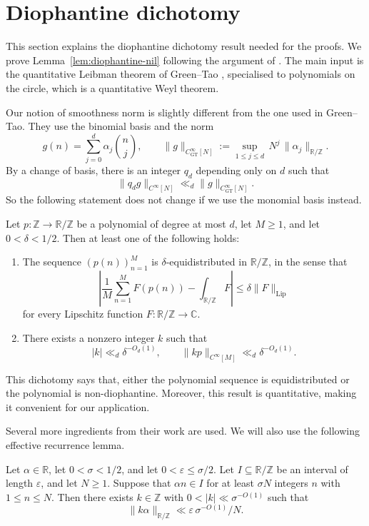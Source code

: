 \section{Diophantine dichotomy}
\label{sec:diophantine}
This section explains the diophantine dichotomy result needed for the proofs.
We
prove Lemma~\ref{lem:diophantine-nil}  following the
argument of \cite[\S3]{GTmob}. The main input is the quantitative Leibman theorem of Green--Tao \cite[Theorem~2.9, Proposition~4.3]{BT}, specialised to polynomials on the circle, which is a quantitative Weyl theorem.

Our notion of smoothness norm is slightly different from the one used in Green--Tao.
They \cite[Definition~2.7]{BT} use the binomial basis and the norm
\[
g(n)=\sum_{j=0}^d \alpha_j\binom{n}{j},
\qquad
\|g\|_{C_{\mathrm{GT}}^\infty[N]}
:=\sup_{1\leq j\leq d}\, N^j\,\|\alpha_j\|_{\mathbb{R}/\mathbb{Z}}.
\]
By a change of basis, there is an integer $q_d$ depending only on $d$ such that
\[
\|q_d g\|_{C^\infty[N]} \ll_d \|g\|_{C_{\mathrm{GT}}^\infty[N]}.
\]
So the following statement does not change if we use the monomial basis instead.

\begin{theorem}
\label{prop:quantitative-weyl-circle}
\label{prop:gt-weyl}
Let \(p\colon\mathbb Z\to\mathbb R/\mathbb Z\) be a polynomial of degree at
most \(d\), let \(M\geq1\), and let \(0<\delta<1/2\).  Then at least one of
the following holds:
\begin{enumerate}
    \item The sequence \((p(n))_{n=1}^M\) is
    \(\delta\)-equidistributed in \(\mathbb R/\mathbb Z\), in the sense that
    \[
    \left|\frac1M\sum_{n=1}^M F(p(n))
    -\int_{\mathbb R/\mathbb Z}F\right|
    \leq\delta\|F\|_{\mathrm{Lip}}
    \]
    for every Lipschitz function
    \(F\colon\mathbb R/\mathbb Z\to\mathbb C\).
    \item There exists a nonzero integer \(k\) such that
    \[
    |k|\ll_d\delta^{-O_d(1)},
    \qquad
    \|kp\|_{C^\infty[M]}
    \ll_d\delta^{-O_d(1)}.
    \]
\end{enumerate}
\end{theorem}
This dichotomy says that, either the polynomial sequence
is equidistributed or the polynomial is non-diophantine. Moreover, this result is quantitative, making it convenient for our application.

Several more ingredients from their work are used.
We will also use the following effective recurrence lemma.
\begin{lemma}
\label{lem:bt-recurrence}
Let \(\alpha\in\mathbb R\), let \(0<\sigma<1/2\), and let \(0<\varepsilon\le\sigma/2\).
Let \(I\subseteq\mathbb R/\mathbb Z\) be an interval of length \(\varepsilon\), and let \(N\ge 1\).
Suppose that \(\alpha n\in I\) for at least \(\sigma N\) integers \(n\) with \(1\le n\le N\).
Then there exists \(k\in\mathbb Z\) with \(0<|k|\ll\sigma^{-O(1)}\) such that
\[
\|k\alpha\|_{\mathbb R/\mathbb Z}\ll\varepsilon\,\sigma^{-O(1)}/N.
\]
\end{lemma}


